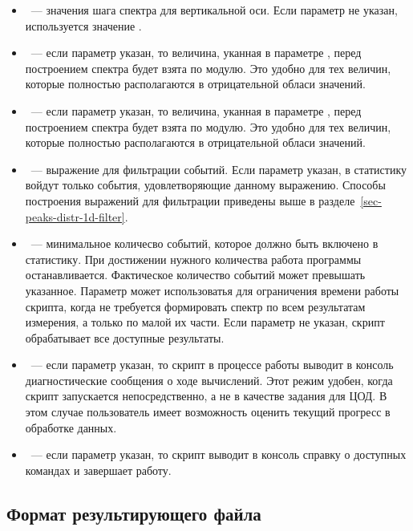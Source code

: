 \begin{itemize}
\item {}~--- значения шага спектра для вертикальной оси. Если параметр не указан, используется значение .

\item {}~--- если параметр указан, то величина, уканная в параметре , перед построением спектра будет взята по модулю. Это удобно для тех величин, которые полностью располагаются в отрицательной обласи значений.

\item {}~--- если параметр указан, то величина, уканная в параметре , перед построением спектра будет взята по модулю. Это удобно для тех величин, которые полностью располагаются в отрицательной обласи значений.

\item {}~--- выражение для фильтрации событий. Если параметр указан, в статистику войдут только события, удовлетворяющие данному выражению. Способы построения выражений для фильтрации приведены выше в разделе~\ref{sec-peaks-distr-1d-filter}.

\item {}~--- минимальное количесво событий, которое должно быть включено в статистику. При достижении нужного количества работа программы останавливается. Фактическое количество событий может превышать указанное. Параметр может использоватья для ограничения времени работы скрипта, когда не требуется формировать спектр по всем результатам измерения, а только по малой их части. Если параметр не указан, скрипт обрабатывает все доступные результаты.

\item {}~--- если параметр указан, то скрипт в процессе работы выводит в консоль диагностические сообщения о ходе вычислений. Этот режим удобен, когда скрипт запускается непосредственно, а не в качестве задания для ЦОД. В этом случае пользователь имеет возможность оценить текущий прогресс в обработке данных.

\item {}~--- если параметр указан, то скрипт выводит в консоль справку о доступных командах и завершает работу.

\end{itemize}

\subsection{Формат результирующего файла}

